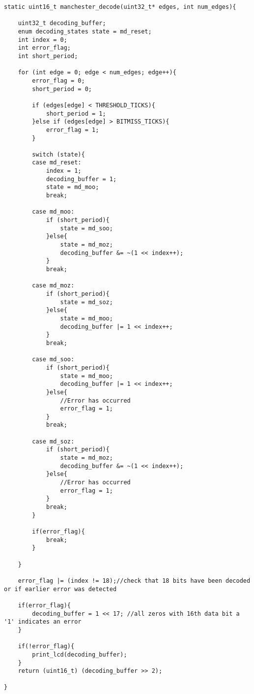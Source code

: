 \begin{lstlisting}[style=cstyle, caption=Manchester Decoding - State Machine Implemenation, label=lst:decode_manchester_implementation]
static uint16_t manchester_decode(uint32_t* edges, int num_edges){

	uint32_t decoding_buffer;
	enum decoding_states state = md_reset;
	int index = 0;
	int error_flag;
	int short_period;
	
	for (int edge = 0; edge < num_edges; edge++){
		error_flag = 0;
		short_period = 0;
		
		if (edges[edge] < THRESHOLD_TICKS){
			short_period = 1;
		}else if (edges[edge] > BITMISS_TICKS){
			error_flag = 1;
		}
		
		switch (state){
		case md_reset:
			index = 1;
			decoding_buffer = 1;
			state = md_moo;
			break;
		
		case md_moo:
			if (short_period){
				state = md_soo;
			}else{
				state = md_moz;
				decoding_buffer &= ~(1 << index++);
			}
			break;
		
		case md_moz:
			if (short_period){
				state = md_soz;
			}else{
				state = md_moo;
				decoding_buffer |= 1 << index++;
			}
			break;
		
		case md_soo:
			if (short_period){
				state = md_moo;
				decoding_buffer |= 1 << index++;
			}else{
				//Error has occurred
				error_flag = 1;
			}
			break;
		
		case md_soz:
			if (short_period){
				state = md_moz;
				decoding_buffer &= ~(1 << index++);
			}else{
				//Error has occurred
				error_flag = 1;
			}
			break;
		}
		
		if(error_flag){
			break;
		}
	
	}
	
	error_flag |= (index != 18);//check that 18 bits have been decoded or if earlier error was detected
	
	if(error_flag){
		decoding_buffer = 1 << 17; //all zeros with 16th data bit a '1' indicates an error
	}
	
	if(!error_flag){
		print_lcd(decoding_buffer);
	}
	return (uint16_t) (decoding_buffer >> 2);

}
\end{lstlisting}